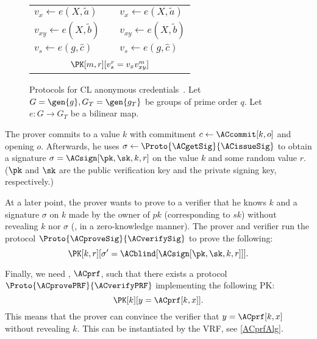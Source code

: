 \begin{figure}[p]
\begin{tabular}{lcl}
    \(v_x\gets e(X, \tilde a)\)
    &
    & \(v_x\gets e(X, \tilde a)\)

    \\

    \(v_{xy}\gets e(X, \tilde b)\)
    &
    & \(v_{xy}\gets e(X, \tilde b)\)

    \\

    \(v_s\gets e(g, \hat c)\)
    &
    & \(v_s\gets e(g, \hat c)\)

    \\\\

    \multicolumn{3}{c}{\(\PK[m,r][v_s^r = v_x v_{xy}^m]\)}

    \\\bottomrule
  \end{tabular}
  \caption{\label{ACacAlg}%
    Protocols for CL anonymous credentials~\cite{CLsignatures}.
    Let \(G = \gen{g}, G_T = \gen{g_T}\) be groups of prime order \(q\).
    Let \(e\colon G\to G_T\) be a bilinear map.
  }
\end{figure}

The prover commits to a value \(k\) with commitment \(c\gets \ACcommit[k, o]\) 
and opening \(o\).
Afterwards, he uses \(\sigma\gets \Proto{\ACgetSig}{\ACissueSig}\) to obtain a 
signature \(\sigma = \ACsign[\pk, \sk, k, r]\) on the value \(k\) and some 
random value \(r\).
(\(\pk\) and \(\sk\) are the public verification key and the private signing 
key, respectively.)

At a later point, the prover wants to prove to a verifier that he knows \(k\) and a signature \(\sigma\) on \(k\) made by the owner of \(pk\) (corresponding to \(sk\)) without revealing \(k\) nor \(\sigma\) (\ie, in a zero-knowledge manner).
The prover and verifier run the protocol \(\Proto{\ACproveSig}{\ACverifySig}\) 
to prove the following:
\begin{equation*}
  \PK[k, r][\sigma' = \ACblind[\ACsign[\pk, \sk, k, r]]].
\end{equation*}

Finally, we need , \(\ACprf\), such that there exists a protocol 
\(\Proto{\ACprovePRF}{\ACverifyPRF}\) implementing the following \ac{PK}:
\begin{equation*}
  \PK[k][y = \ACprf[k, x]].
\end{equation*}
This means that the prover can convince the verifier that \(y = \ACprf[k, x]\) 
without revealing \(k\).
This can be instantiated by the \textcite{DY-VRF} \ac{VRF}, see 
\cref{ACprfAlg}.

